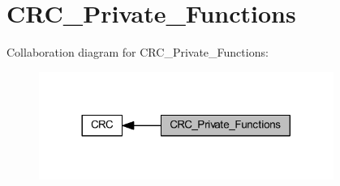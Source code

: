 \hypertarget{group___c_r_c___private___functions}{}\section{C\+R\+C\+\_\+\+Private\+\_\+\+Functions}
\label{group___c_r_c___private___functions}
Collaboration diagram for C\+R\+C\+\_\+\+Private\+\_\+\+Functions\+:
\nopagebreak
\begin{figure}[H]
\begin{center}
\leavevmode
\includegraphics[width=272pt]{group___c_r_c___private___functions}
\end{center}
\end{figure}
